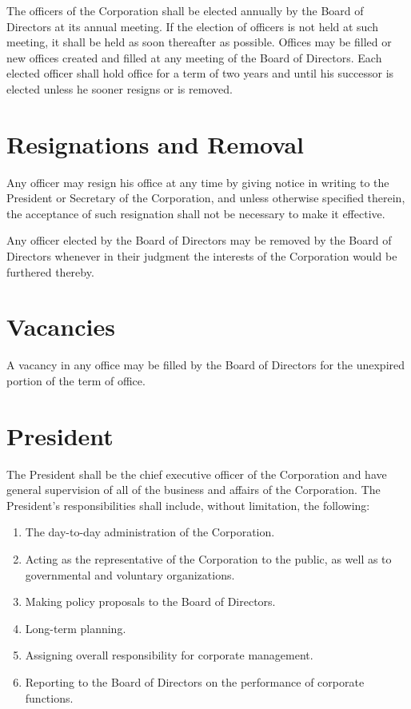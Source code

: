 \documentclass[12pt]{report}
\begin{document}
The officers of the Corporation shall be elected annually by the Board of Directors at its annual meeting. If the election of officers is not held at such meeting, it shall be held as soon thereafter as possible. Offices may be filled or new offices created and filled at any meeting of the Board of Directors. Each elected officer shall hold office for a term of two years and until his successor is elected unless he sooner resigns or is removed.

\section{Resignations and Removal}

Any officer may resign his office at any time by giving notice in writing to the President or Secretary of the Corporation, and unless otherwise specified therein, the acceptance of such resignation shall not be necessary to make it effective.

Any officer elected by the Board of Directors may be removed by the Board of Directors whenever in their judgment the interests of the Corporation would be furthered thereby.

\section{Vacancies}

A vacancy in any office may be filled by the Board of Directors for the unexpired portion of the term of office.

\section{President}

The President shall be the chief executive officer of the Corporation and have general supervision of all of the business and affairs of the Corporation. The President's responsibilities shall include, without limitation, the following:

\begin{enumerate}

\item The day-to-day administration of the Corporation.

\item Acting as the representative of the Corporation to the public, as well as to governmental and voluntary organizations.

\item Making policy proposals to the Board of Directors.

\item Long-term planning.

\item Assigning overall responsibility for corporate management.

\item Reporting to the Board of Directors on the performance of corporate functions.

\end{enumerate}
\end{document}

